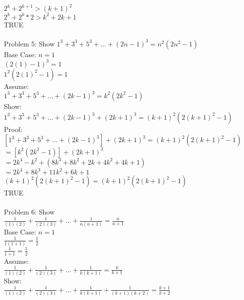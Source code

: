 \documentclass[12pt]{article}
\begin{document}
        \\\indent \indent $ 2^k + 2^{k+1} > (k+1)^2 $
        \\\indent \indent $ 2^k + 2^k*2 > k^2 + 2k+ 1 $
        \\\indent \indent TRUE
        \\
        \\Problem 5: Show 
        $1^3 + 3^3 + 5^3 + \ldots + (2n-1)^3 = n^2(2n^2-1) $
        \\\indent Base Case: $n=1$
        \\\indent \indent $(2(1)-1)^3=1$
        \\\indent \indent $1^2(2(1)^2-1)=1$
        \\\indent Assume:
        \\\indent \indent 
        $1^3 + 3^3 + 5^3 + \ldots + (2k-1)^3 = k^2(2k^2-1)$
        \\\indent Show:
        \\\indent \indent 
        $1^3 + 3^3 + 5^3 + \ldots + (2k-1)^3 + (2k+1)^3 = (k+1)^2(2(k+1)^2-1)$
        \\\indent Proof:
        \\\indent \indent
        $[1^3 + 3^3 + 5^3 + \ldots + (2k-1)^3 ]+ (2k+1)^3 = (k+1)^2(2(k+1)^2-1)$
        \\\indent \indent $=[k^2(2k^2-1)]+(2k+1)^3$
        \\\indent \indent $=2k^4-k^2+(8k^3+8k^2+2k+4k^2+4k+1)$
        \\\indent \indent $=2k^4+8k^3+11k^2+6k+1$
        \\\indent \indent $(k+1)^2(2(k+1)^2-1) = (k+1)^2(2(k+1)^2-1)$
        \\\indent \indent TRUE
        \\
        \\Problem 6: Show 
        \\\indent \indent $ \frac{1}{(1)(2)}+ \frac{1}{(2)(3)}+ \ldots + \frac{1}{n(n+1)} = \frac{n}{n+1}$
        \\\indent Base Case: $n=1$
        \\\indent \indent $\frac{1}{1(1+1)} =\frac{1}{2}$
        \\\indent \indent $\frac{1}{1+1} =\frac{1}{2}$
        \\\indent Assume:
        \\\indent \indent $ \frac{1}{(1)(2)}+ \frac{1}{(2)(3)}+ \ldots + \frac{1}{k(k+1)} = \frac{k}{k+1}$
        \\\indent Show:
        \\\indent \indent $ \frac{1}{(1)(2)}+ \frac{1}{(2)(3)}+ \ldots + \frac{1}{k(k+1)} + \frac{1}{(k+1)(k+2)} = \frac{k+1}{k+2}$
\end{document}
